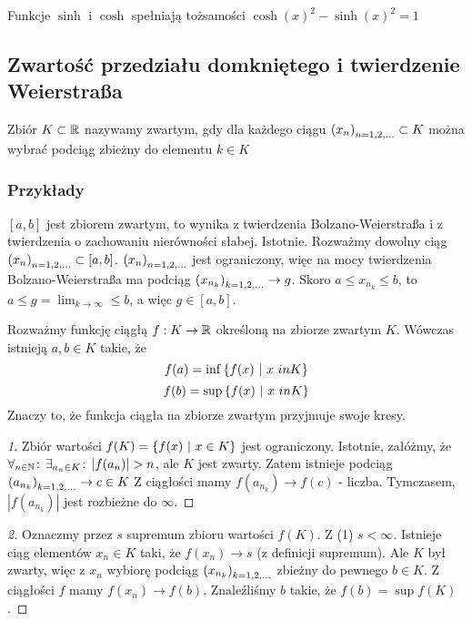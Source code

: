\documentclass[9pt]{article}
\begin{document}
Funkcje $\sinh$ i $\cosh$ spełniają tożsamości $\cosh(x)^2 - \sinh(x)^2 = 1$

\subsection{Zwartość przedziału domkniętego i twierdzenie Weierstraßa}

\begin{Def}
    Zbiór $K \subset \mathbb{R}$ nazywamy zwartym, gdy dla każdego ciągu $\left(x_n\right)_{n = 1,2,...} \subset K$ można wybrać
    podciąg zbieżny do elementu $k \in K$
\end{Def}

\subsubsection*{Przykłady}

$\left[a,b\right]$ jest zbiorem zwartym, to wynika z twierdzenia Bolzano-Weierstraßa i z twierdzenia
o zachowaniu nierówności słabej. Istotnie. Rozważmy dowolny ciąg
$\left(x_n\right)_{n = 1,2,...} \subset \left[a,b\right]$. $\left(x_n\right)_{n = 1,2,...}$ jest ograniczony, więc na mocy twierdzenia
Bolzano-Weierstraßa ma podciąg $\left(x_{n_k}\right)_{k = 1,2,...} \to g$. Skoro $a \le x_{n_k} \le b$, to 
$a \le g = \lim_{k \to \infty} \le b$, a więc $g \in \left[a,b\right]$.

\begin{Twi}
    Rozważmy funkcję ciągłą $f: K \to \mathbb{R}$ określoną na zbiorze zwartym $K$. Wówczas istnieją $a, b
    \in K$ takie, że
    \[
        f(a) = \inf \left\{f(x) \ |\  x \ in K\right\}
    \]
    \[
        f(b) = \sup \left\{f(x) \ |\  x \ in K\right\}
    \]
    Znaczy to, że funkcja ciągła na zbiorze zwartym przyjmuje swoje kresy.
\end{Twi}

\begin{proof}[1]
    Zbiór wartości $f(K)  = \left\{f(x) \ |\  x \in K\right\}$ jest ograniczony. Istotnie, załóżmy,
    że $\forall_{n \in \mathbb{N}} \! : \,\exists_{a_n \in K} \! : \,\left|f(a_n)\right| > n$, ale $K$ jest zwarty. Zatem istnieje
    podciąg $\left(a_{n_k}\right)_{k = 1,2,...} \to c \in K$ Z ciągłości mamy $f(a_{n_k}) \to f(c)$ - liczba.
    Tymczasem, $\left|f(a_{n_k})\right|$ jest rozbieżne do $\infty$.
\end{proof}
\begin{proof}[2]
    Oznaczmy przez $s$ supremum zbioru wartości $f(K)$. Z (1) $s < \infty$. Istnieje ciąg elementów
    $x_n \in K$ taki, że $f(x_n) \to s$ (z definicji supremum). Ale $K$ był zwarty, więc z $x_n$
    wybiorę podciąg $\left(x_{n_k}\right)_{k = 1,2,...}$ zbieżny do pewnego $b \in K$. Z ciągłości $f$ mamy $f(x_n) \to
    f(b)$. Znaleźliśmy $b$ takie, że $f(b) = \sup f(K)$.
\end{proof}
\end{document}

